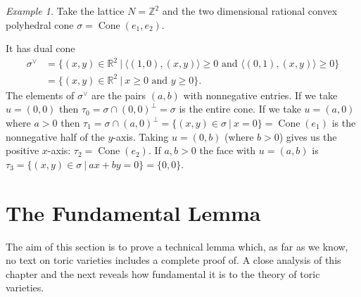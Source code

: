 \documentclass[BSc]{usydthesis}
\numberwithin{equation}{chapter}
\theoremstyle{remark}
\newtheorem{Example}[equation]{Example}
\newcommand{\R}{\mathbb{R}}
\newcommand{\Z}{\mathbb{Z}}
\newcommand{\V}{\vee}
\DeclareMathOperator{\Cone}{Cone}
\begin{document}
\begin{Example} Take the lattice $N=\Z^2$ and the two dimensional rational convex polyhedral cone $\sigma=\Cone(e_1, e_2).$

\begin{figure}[ht]
  \centering
  \label{figure:lattice1}
\end{figure}

It has dual cone  
\begin{align*}
\sigma^{\V} &= \{ (x,y)\in \R^2 \ | \ \langle (1,0), (x,y)\rangle \geq 0  \text{ and } \langle (0,1), (x,y) \rangle \geq 0 \} \\
            &= \{ (x,y) \in \R^2 \ | \ x\geq 0 \text{ and }  y\geq 0 \}.
\end{align*}
The elements of  $\sigma^{\V}$ are the pairs $(a,b)$ with nonnegative entries. If we take $u=(0,0)$ then $\tau_0 = \sigma \cap (0,0)^{\perp} = \sigma$ is the entire cone. If we take $u=(a,0)$ where $a>0$ then $ \tau_1 = \sigma \cap (a,0)^{\perp} = \{ (x,y)\in \sigma \ | \ x=0 \} = \Cone(e_1) $ is the nonnegative half of the $y$-axis. Taking $u=(0,b)$ (where $b>0$) gives us the positive $x$-axis: $\tau_2 = \Cone(e_2).$ If $a,b>0$ the face with $u=(a,b)$ is $\tau_3 = \{ (x,y)\in \sigma  \ | \ ax+by=0 \}=\{ 0,0\}. $
\end{Example}
\section{The Fundamental Lemma}
The aim of this section is to prove a technical lemma which, as far as we know, no text on toric varieties includes a complete proof of. A close analysis of this chapter and the next reveals how fundamental it is to the theory of toric varieties.
\end{document}
